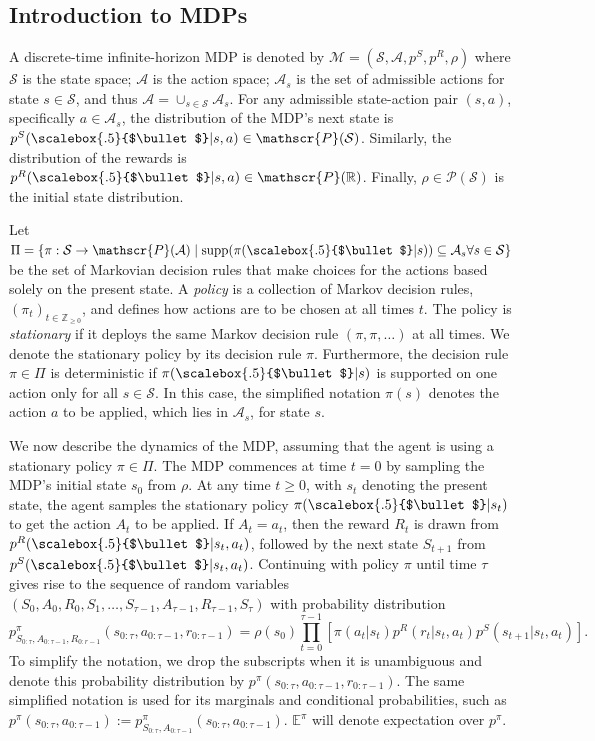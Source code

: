 \documentclass{amsart}
\renewcommand{\cdot}[1][.5]{%
  \mathbin{\vcenter{\hbox{\scalebox{#1}{$\bullet$}}}}%
}
\begin{document}
\subsection{Introduction to MDPs}
\label{sec:mdp}
A discrete-time infinite-horizon MDP is denoted by 
$\mathcal{M}=(\mathcal{S}, \mathcal{A}, p^S, p^R, \rho)$ \citep{putermanrl} where $\mathcal{S}$ is the state space; $\mathcal{A}$ is the action space; $\mathcal{A}_s$ is the set of admissible actions for state $s \in \mathcal{S}$, and thus $\mathcal{A} = \cup_{s \in \mathcal{S}} \mathcal{A}_s$. For any admissible state-action pair $(s,a)$, specifically $a \in \mathcal{A}_s$, the distribution of the MDP's next state is $p^S(\cdot|s,a) \in \mathscr{P}(\mathcal{S})$. Similarly, the distribution of the rewards is $p^R(\cdot|s,a) \in \mathscr{P}(\mathbb{R})$. Finally, $\rho \in \mathscr{P}(\mathcal{S})$ is the initial state distribution.

Let $\Pi = \{\pi: \mathcal{S} \rightarrow \mathscr{P}(\mathcal{A}) \mid \text{supp}(\pi(\cdot|s)) \subseteq \mathcal{A}_s \forall s \in \mathcal{S}\}$ be the set of Markovian decision rules that make choices for the actions based solely on the present state. A {\it policy} is a collection of Markov decision rules, $(\pi_t)_{t \in \mathbb{Z}_{\geq 0}}$, and defines how actions are to be chosen at all times $t$. The policy is  {\it stationary} if it deploys the same  Markov decision rule $(\pi,\pi,\ldots)$ at all times. We denote the stationary policy by its decision rule $\pi$. Furthermore, the decision rule $\pi \in \Pi$ is deterministic if $\pi(\cdot|s)$ is supported on one action only for all $s \in \mathcal{S}$. In this case, the simplified notation $\pi(s)$ denotes the action $a$ to be applied, which lies in $\mathcal{A}_s$, for state $s$.

We now describe the dynamics of the MDP, assuming that the agent is using a stationary policy $\pi \in \Pi$. The MDP commences at time $t=0$ by sampling the MDP's initial state $s_0$ from $\rho$. At any time $t\geq0$, with  $s_t$ denoting the present state, the agent samples the stationary policy  $\pi(\cdot|s_t)$ to get the action $A_t$ to be applied. If $A_t=a_t$, then the reward $R_t$ is drawn from $p^R(\cdot|s_t,a_t)$, followed by the next state $S_{t+1}$ from $ p^S(\cdot|s_t,a_t)$. Continuing with policy $\pi$ until time $\tau$ gives rise to the sequence of random variables $(S_0,A_0,R_0,S_1,\dots,S_{\tau-1},A_{\tau-1},R_{\tau-1},S_\tau)$ with probability distribution
\begin{equation*}
p^\pi_{S_{0:\tau},A_{0:\tau-1},R_{0:r-1}}(s_{0:\tau},a_{0:\tau-1},r_{0:\tau-1}) = \rho(s_0)\prod_{t=0}^{\tau-1} [\pi(a_t|s_t)p^R(r_t|s_t,a_t)p^S(s_{t+1}|s_t,a_t)].
\end{equation*}
To simplify the notation, we drop the subscripts when it is unambiguous and denote this probability distribution by  $p^\pi(s_{0:\tau},a_{0:\tau-1},r_{0:\tau-1})$. The same simplified notation is used for its marginals and conditional probabilities, such as $p^\pi(s_{0:\tau},a_{0:\tau-1}) := p^\pi_{S_{0:\tau},A_{0:\tau-1}}(s_{0:\tau},a_{0:\tau-1})$. $\mathbb{E}^\pi$ will denote expectation over $p^\pi$. 
\end{document}
